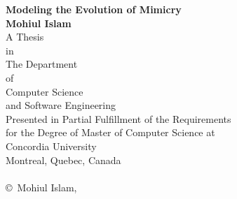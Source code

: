 \begin{titlepage}
\begin{center}

\LARGE \textbf{Modeling the Evolution of Mimicry}\\[1.5cm]
\large \textbf{Mohiul Islam}\\[2.5cm]
\large A Thesis\\ in\\ The Department\\ of\\ Computer Science\\ and Software Engineering\\[2.5cm]
\large Presented in Partial Fulfillment of the Requirements\\ for the Degree of Master of Computer Science at\\ Concordia University\\ Montreal, Quebec, Canada\\[1.5cm]
\large \monthname \ \the \year \\[2cm]
\vfill
\large \copyright \ Mohiul Islam, \the \year
\end{center}
\end{titlepage}
